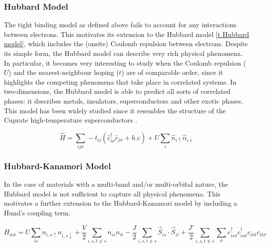\documentclass[11pt]{article}
\begin{document}
\newpage

\subsubsection{Hubbard Model}
\label{subsec: HubbardModel}

The  tight binding model as defined above fails to account for any interactions between electrons. 
This motivates its extension to the Hubbard model \eqref{t Hubbard model}, which includes the (onsite) Coulomb repulsion between electrons. 
Despite its simple form, the Hubbard model can describe very rich physical phenomena.
In particular, it becomes very interesting to study when the Coulomb repulsion ($U$) and the nearest-neighbour hoping ($t$) are of comparable order, since it highlights the competing phenomena that take place in correlated systems. 
In two-dimensions, the Hubbard model is able to predict all sorts of correlated phases: it describes metals, insulators, superconductors and other exotic phases\cite{white1989numerical,hirsch1985two, anderson1990luttinger,sun2011nearly}. 
This model has been widely studied since it resembles the structure of the Cuprate high-temperature superconductors \cite{dagotto1994correlated}. 




\begin{equation}\label{t Hubbard model}
    \hat{H} = \sum_{ij\sigma} -t_{ij}(\hat{c}_{i\sigma}^{\dagger}\hat{c}_{j \sigma} + h.c) 
    + U \sum_{i} \hat{n}_{i \uparrow} \hat{n}_{i \downarrow}
\end{equation}





\subsubsection{Hubbard-Kanamori Model}
\label{subsubsec: HKmodel}
In the case of materials with a multi-band and/or multi-orbital nature, 
the Hubbard model is not sufficient to capture all physical phenomena. 
This motivates a further extension to the Hubbard-Kanamori model\cite{sherman2020hubbard} by including a Hund's coupling term.

\begin{equation} \label{Hubbard-Kanamori Model}
    H_{int} = U \sum_{is}n_{i,s\uparrow}n_{i,s\downarrow} + \frac{V}{2} \sum_{i,s,t \neq s} n_{is}n_{it} -\frac{J}{2} \sum_{i,s,t \neq s} \vec{S}_{is} \cdot \vec{S}_{it} 
    + \frac{J'}{2} \sum_{i,s,t \neq s} \sum_{\sigma} c_{is\sigma}^{\dagger}c_{is\bar{\sigma}}^{\dagger}c_{it\bar{\sigma}}c_{it\sigma}
\end{equation}
\end{document}

